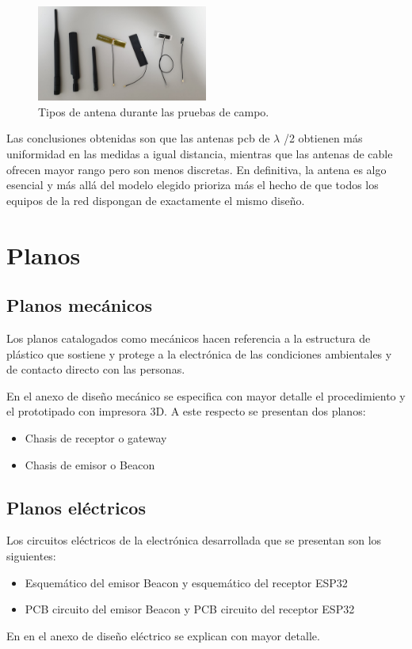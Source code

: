 \documentclass[paper=a4, fontsize=11pt,twoside]{scrartcl}	%
\begin{document}
            \begin{center}
                \begin{figure}[ht]
                    \centering
                    \includegraphics[width=0.5\textwidth]{antennas_variety.jpeg}
                    \caption{Tipos de antena durante las pruebas de campo.}
                    \label{fig:mesh11}
                \end{figure}
            \end{center}
            Las conclusiones obtenidas son que las antenas pcb de $\lambda$ /2 obtienen más uniformidad en las medidas a igual distancia,
            mientras que las antenas de cable ofrecen mayor rango pero son menos discretas. En definitiva, la antena es algo esencial y más 
            allá del modelo elegido prioriza más el hecho de que todos los equipos de la red dispongan de exactamente el mismo diseño.
\section{Planos}
    \subsection{Planos mecánicos}
        Los planos catalogados como mecánicos hacen referencia a la estructura de plástico
        que sostiene y protege a la electrónica de las condiciones ambientales y de contacto directo con las 
        personas.

        En el anexo de diseño mecánico se especifica con mayor detalle el procedimiento y el prototipado con impresora
        3D. A este respecto se presentan dos planos:
        \begin{itemize}
            \item Chasis de receptor o gateway
            \item Chasis de emisor o Beacon
        \end{itemize}
    \subsection{Planos eléctricos}
        Los circuitos eléctricos de la electrónica desarrollada que se presentan son los siguientes:
        \begin{itemize}
            \item Esquemático del emisor Beacon y esquemático del receptor ESP32
            \item PCB circuito del emisor Beacon y PCB circuito del receptor ESP32
        \end{itemize}
        En en el anexo de diseño eléctrico se explican con mayor detalle.
\end{document}
